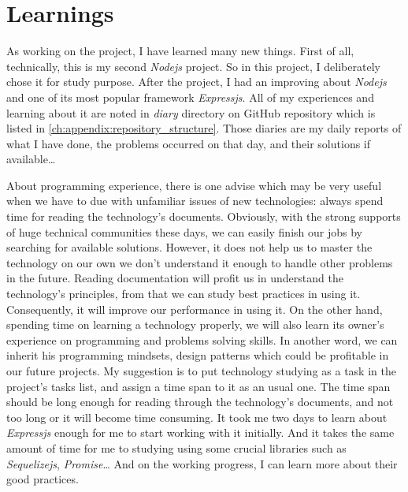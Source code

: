 \section{Learnings}

As working on the project, I have learned many new things.
First of all, technically, this is my second \emph{Nodejs} project.
So in this project, I deliberately chose it for study purpose.
After the project, I had an improving about \emph{Nodejs} and one of its most popular framework \emph{Expressjs}.
All of my experiences and learning about it are noted in \emph{diary} directory on GitHub repository which is listed in \autoref{ch:appendix:repository_structure}.
Those diaries are my daily reports of what I have done, the problems occurred on that day, and their solutions if available\dots

About programming experience, there is one advise which may be very useful when we have to due with unfamiliar issues of new technologies: always spend time for reading the technology's documents.
Obviously, with the strong supports of huge technical communities these days, we can easily finish our jobs by searching for available solutions.
However, it does not help us to master the technology on our own \ie we don't understand it enough to handle other problems in the future.
Reading documentation will profit us in understand the technology's principles, from that we can study best practices in using it.
Consequently, it will improve our performance in using it.
On the other hand, spending time on learning a technology properly, we will also learn its owner's experience on programming and problems solving skills.
In another word, we can inherit his programming mindsets, design patterns which could be profitable in our future projects.
My suggestion is to put technology studying as a task in the project's tasks list, and assign a time span to it as an usual one.
The time span should be long enough for reading through the technology's documents, and not too long or it will become time consuming.
It took me two days to learn about \emph{Expressjs} enough for me to start working with it initially.
And it takes the same amount of time for me to studying using some crucial libraries such as \emph{Sequelizejs}, \emph{Promise}\dots
And on the working progress, I can learn more about their good practices.

